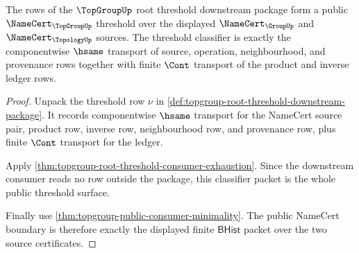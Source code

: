 \begin{theorem}
\label{thm:topgroup-root-threshold-namecert-threshold}
The rows of the $\TopGroupUp$ root threshold downstream package form a public
$\NameCert_{\TopGroupUp}$ threshold over the displayed
$\NameCert_{\GroupUp}$ and $\NameCert_{\TopologyUp}$ sources. The threshold
classifier is exactly the componentwise $\hsame$ transport of source,
operation, neighbourhood, and provenance rows together with finite
$\Cont$ transport of the product and inverse ledger rows.
\end{theorem}
\begin{proof}
Unpack the threshold row $\nu$ in
\autoref{def:topgroup-root-threshold-downstream-package}. It records
componentwise $\hsame$ transport for the NameCert source pair, product row,
inverse row, neighbourhood row, and provenance row, plus finite $\Cont$
transport for the ledger.

Apply \autoref{thm:topgroup-root-threshold-consumer-exhaustion}. Since the
downstream consumer reads no row outside the package, this classifier packet
is the whole public threshold surface.

Finally use \autoref{thm:topgroup-public-consumer-minimality}. The public
NameCert boundary is therefore exactly the displayed finite
$\mathsf{BHist}$ packet over the two source certificates.
\end{proof}

